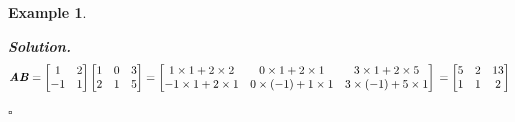 \documentclass[12pt, a4paper]{article}
\newtheorem{eg}{Example}[subsection]
\newenvironment*{sol}{\indent\textbf{Solution. }}{\hfill{$\square$}\par}
\def\matrixA{\textbf{\emph{A}}}
\def\matrixB{\textbf{\emph{B}}}
\begin{document}
\begin{eg}
\begin{enumerate}
	\begin{sol}\[	\matrixA\matrixB=\begin{bmatrix}1&2\\-1&1\end{bmatrix}\begin{bmatrix}1&0&3\\2&1&5\end{bmatrix}=\begin{bmatrix}1\times1+2\times2&0\times1+2\times1&3\times1+2\times5\\-1\times1+2\times1&0\times(-1)+1\times1&3\times(-1)+5\times1\end{bmatrix}\\=\begin{bmatrix}5&2&13\\1&1&2\end{bmatrix}\]\end{sol}
\end{enumerate}	
\end{eg}
\end{document}
